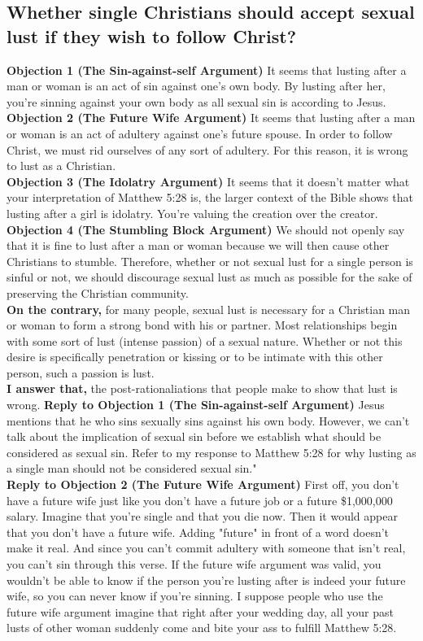 \documentclass[a4paper, parskip=full, 12pt]{article}
\begin{document}
\subsection{Whether single Christians should accept sexual lust if they wish to follow Christ?}
\textbf{Objection 1 (The Sin-against-self Argument)} It seems that lusting after a man or woman is an act of sin against one's own body. By lusting after her, you're sinning against your own body as all sexual sin is according to Jesus. \\
\textbf{Objection 2 (The Future Wife Argument)} It seems that lusting after a man or woman is an act of adultery against one's future spouse. In order to follow Christ, we must rid ourselves of any sort of adultery. For this reason, it is wrong to lust as a Christian. \\
\textbf{Objection 3 (The Idolatry Argument)} It seems that it doesn't matter what your interpretation of Matthew 5:28 is, the larger context of the Bible shows that lusting after a girl is idolatry. You're valuing the creation over the creator. \\
\textbf{Objection 4 (The Stumbling Block Argument)} We should not openly say that it is fine to lust after a man or woman because we will then cause other Christians to stumble. Therefore, whether or not sexual lust for a single person is sinful or not, we should discourage sexual lust as much as possible for the sake of preserving the Christian community. \\
\textbf{On the contrary,} for many people, sexual lust is necessary for a Christian man or woman to form a strong bond with his or partner. Most relationships begin with some sort of lust (intense passion) of a sexual nature. Whether or not this desire is specifically penetration or kissing or to be intimate with this other person, such a passion is lust. \\
\textbf{I answer that,} the post-rationaliations that people make to show that lust is wrong.
\textbf{Reply to Objection 1 (The Sin-against-self Argument)} Jesus mentions that he who sins sexually sins against his own body. However, we can't talk about the implication of sexual sin before we establish what should be considered as sexual sin. Refer to my response to Matthew 5:28 for why lusting as a single man should not be considered sexual sin." \\
\textbf{Reply to Objection 2 (The Future Wife Argument)} First off, you don't have a future wife just like you don't have a future job or a future \$1,000,000 salary. Imagine that you're single and that you die now. Then it would appear that you don't have a future wife. Adding "future" in front of a word doesn't make it real. And since you can't commit adultery with someone that isn't real, you can't sin through this verse. If the future wife argument was valid, you wouldn't be able to know if the person you're lusting after is indeed your future wife, so you can never know if you're sinning. I suppose people who use the future wife argument imagine that right after your wedding day, all your past lusts of other woman suddenly come and bite your ass to fulfill Matthew 5:28.
\end{document}
